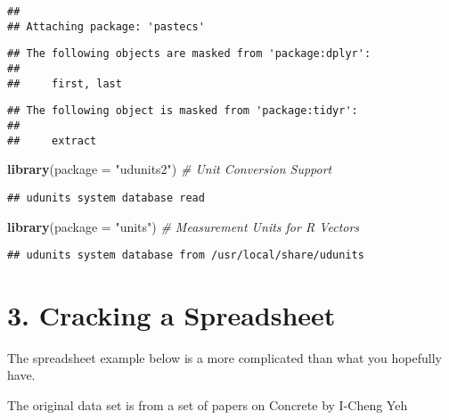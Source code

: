 \documentclass[]{article}
\newenvironment{Shaded}{\begin{snugshade}}{\end{snugshade}}
\newcommand{\CommentTok}[1]{\textcolor[rgb]{0.56,0.35,0.01}{\textit{#1}}}
\newcommand{\DataTypeTok}[1]{\textcolor[rgb]{0.13,0.29,0.53}{#1}}
\newcommand{\KeywordTok}[1]{\textcolor[rgb]{0.13,0.29,0.53}{\textbf{#1}}}
\newcommand{\NormalTok}[1]{#1}
\newcommand{\StringTok}[1]{\textcolor[rgb]{0.31,0.60,0.02}{#1}}
\begin{document}
\begin{verbatim}
## 
## Attaching package: 'pastecs'
\end{verbatim}

\begin{verbatim}
## The following objects are masked from 'package:dplyr':
## 
##     first, last
\end{verbatim}

\begin{verbatim}
## The following object is masked from 'package:tidyr':
## 
##     extract
\end{verbatim}

\begin{Shaded}
\begin{Highlighting}[]
  \KeywordTok{library}\NormalTok{(}\DataTypeTok{package =} \StringTok{"udunits2"}\NormalTok{)  }\CommentTok{# Unit Conversion Support}
\end{Highlighting}
\end{Shaded}

\begin{verbatim}
## udunits system database read
\end{verbatim}

\begin{Shaded}
\begin{Highlighting}[]
  \KeywordTok{library}\NormalTok{(}\DataTypeTok{package =} \StringTok{"units"}\NormalTok{)     }\CommentTok{# Measurement Units for R Vectors}
\end{Highlighting}
\end{Shaded}

\begin{verbatim}
## udunits system database from /usr/local/share/udunits
\end{verbatim}

\hypertarget{cracking-a-spreadsheet}{%
\section{3. Cracking a Spreadsheet}\label{cracking-a-spreadsheet}}

The spreadsheet example below is a more complicated than what you
hopefully have.

The original data set is from a set of papers on Concrete by I-Cheng Yeh
\end{document}
